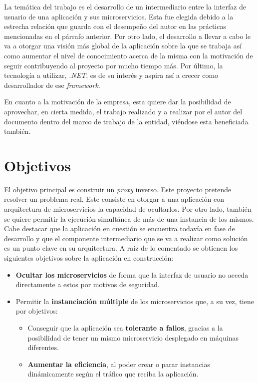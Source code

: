 \documentclass[11pt,spanish,listoffigures]{tfgetsinf}
\begin{document}
La temática del trabajo es el desarrollo de un intermediario entre la interfaz de usuario de una aplicación y sus microservicios. Esta fue elegida debido a la estrecha relación que guarda con el desempeño del autor en las prácticas mencionadas en el párrafo anterior. Por otro lado, el desarrollo a llevar a cabo le va a otorgar una visión más global de la aplicación sobre la que se trabaja así como aumentar el nivel de conocimiento acerca de la misma con la motivación de seguir contribuyendo al proyecto por mucho tiempo más. Por último, la tecnología a utilizar, \emph{.NET}, es de su interés y aspira así a crecer como desarrollador de ese \emph{framework}.

En cuanto a la motivación de la empresa, esta quiere dar la posibilidad de aprovechar, en cierta medida, el trabajo realizado y a realizar por el autor del documento dentro del marco de trabajo de la entidad, viéndose esta beneficiada también.

\section{Objetivos}

El objetivo principal es construir un \emph{proxy} inverso.
Este proyecto pretende resolver un problema real. Este consiste en otorgar a una aplicación con arquitectura de microservicios la capacidad de ocultarlos. Por otro lado, también se quiere permitir la ejecución simultánea de más de una instancia de los mismos. Cabe destacar que la aplicación en cuestión se encuentra todavía en fase de desarrollo y que el componente intermediario que se va a realizar como solución es un punto clave en su arquitectura. A raíz de lo comentado se obtienen los siguientes objetivos sobre la aplicación en construcción:

\begin{itemize}

	\item \textbf{Ocultar los microservicios} de forma que la interfaz de usuario no acceda directamente a estos por motivos de seguridad.
	
	\item Permitir la \textbf{instanciación múltiple} de los microservicios que, a su vez, tiene por objetivos:
		\begin{itemize}
		
			\item Conseguir que la aplicación sea \textbf{tolerante a fallos}, gracias a la posibilidad de tener un mismo microservicio desplegado en máquinas diferentes.
			
			\item \textbf{Aumentar la eficiencia}, al poder crear o parar instancias dinámicamente según el tráfico que reciba la aplicación.
			
		\end{itemize}

\end{itemize}
\end{document}
